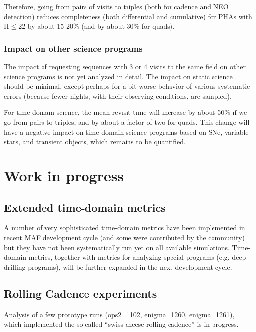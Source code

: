Therefore, going from pairs of visits to triples (both for cadence and NEO detection)
reduces completeness (both differential and cumulative) for PHAs with H$\le$22 by
about 15-20\% (and by about 30\% for quads).



\subsubsection{Impact on other science programs}

The impact of requesting sequences with 3 or 4 visits to the same field on other
science programs is not yet analyzed in detail.  The impact on static science should be
minimal, except perhaps for a bit worse behavior of various systematic errors (because
fewer nights, with their observing conditions, are sampled).

For time-domain science, the mean revisit time will increase by about 50\% if we go
from pairs to triples, and by about a factor of two for quads. This change will have a
negative impact on time-domain science programs based on SNe, variable stars, and
transient objects, which remains to be quantified.


\newpage
\section{Work in progress}



\subsection{Extended time-domain metrics}

A number of very sophisticated time-domain metrics have been implemented in recent
MAF development cycle (and some were contributed by the community) but they have not
been systematically run yet on all available simulations. Time-domain metrics, together
with metrics for analyzing special programs (e.g. deep drilling programs), will be further
expanded in the next development cycle.


\subsection{Rolling Cadence experiments}

Analysis of a few prototype runs (ops2\_1102, enigma\_1260, enigma\_1261), which
implemented the so-called ``swiss cheese rolling cadence'' is in progress.


